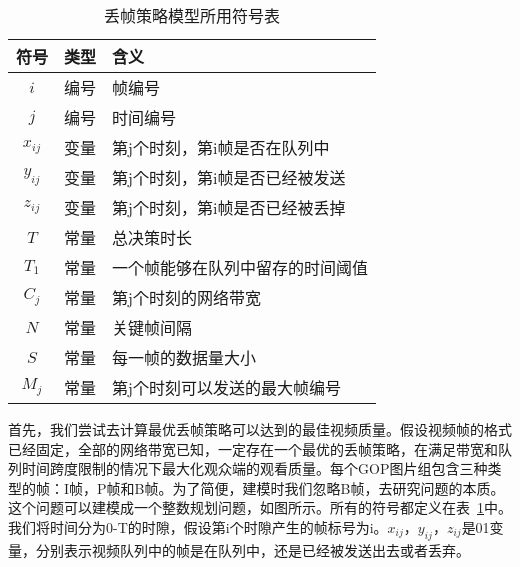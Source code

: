 \begin{table}[tb]
\footnotesize
\centering
\caption{丢帧策略模型所用符号表}
\label{ip_var}
{\setlength{\tabcolsep}{1pt}
\begin{tabular}{|c|c|l|}
\hline
\textbf{符号} & \textbf{类型} & \textbf{含义}                      \\ \hline
$i$               & 编号         & 帧编号                           \\ \hline
$j$               & 编号         & 时间编号                            \\ \hline
$x_{ij}$             & 变量      & 第j个时刻，第i帧是否在队列中\\ \hline
$y_{ij}$             & 变量      & 第j个时刻，第i帧是否已经被发送     \\ \hline
$z_{ij}$             & 变量      & 第j个时刻，第i帧是否已经被丢掉  \\ \hline
$T$               & 常量         &  总决策时长                        \\ \hline
$T_1$             & 常量       & 一个帧能够在队列中留存的时间阈值 \\ \hline
$C_j$              & 常量         & 第j个时刻的网络带宽  \\ \hline
$N$               & 常量         & 关键帧间隔                      \\ \hline
$S$            & 常量         & 每一帧的数据量大小                       \\ \hline
$M_{j}$       & 常量         & 第j个时刻可以发送的最大帧编号 \\ \hline
\end{tabular}}
\end{table}


首先，我们尝试去计算最优丢帧策略可以达到的最佳视频质量。假设视频帧的格式已经固定，全部的网络带宽已知，一定存在一个最优的丢帧策略，在满足带宽和队列时间跨度限制的情况下最大化观众端的观看质量。每个GOP图片组包含三种类型的帧：I帧，P帧和B帧。为了简便，建模时我们忽略B帧，去研究问题的本质。这个问题可以建模成一个整数规划问题，如图所示。所有的符号都定义在表~\ref{ip_var}中。我们将时间分为0-T的时隙，假设第i个时隙产生的帧标号为i。$x_{ij}$，$y_{ij}$，$z_{ij}$是01变量，分别表示视频队列中的帧是在队列中，还是已经被发送出去或者丢弃。

